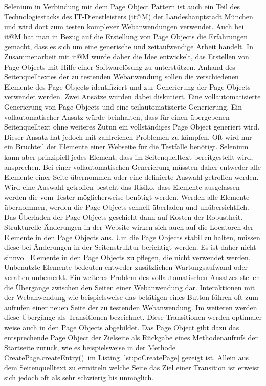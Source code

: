 Selenium in Verbindung mit dem Page Object Pattern ist auch ein Teil des Technologiestacks des IT-Dienstleisters (it@M) der Landeshauptstadt München und wird dort zum testen komplexer Webanwendungen verwendet. Auch bei it@M hat man in Bezug auf die Erstellung von Page Objects die Erfahrungen gemacht, dass es sich um eine generische und zeitaufwendige Arbeit handelt.
In Zusammenarbeit mit it@M wurde daher die Idee entwickelt, das Erstellen von Page Objects mit Hilfe einer Softwarelösung zu unterstützen. 
Anhand des Seitenquelltextes der zu testenden Webanwendung sollen die verschiedenen Elemente des Page Objects identifiziert und zur Generierung der Page Objects verwendet werden.
Zwei Ansätze wurden dabei diskutiert. Eine vollautomatisierte Generierung von Page Objects und eine teilautomatisierte Generierung.
Ein vollautomatischer Ansatz würde beinhalten, dass für einen übergebenen Seitenquelltext ohne weiteres Zutun ein vollständiges Page Object generiert wird. Dieser Ansatz hat jedoch mit zahlreichen Problemen zu kämpfen. Oft wird nur ein Bruchteil der Elemente einer Webseite für die Testfälle benötigt. Selenium kann aber prinzipiell jedes Element, dass im Seitenquelltext bereitgestellt wird, ansprechen. Bei einer vollautomatischen Generierung müssten daher entweder alle Elemente einer Seite übernommen oder eine definierte Auswahl getroffen werden.
Wird eine Auswahl getroffen besteht das Risiko, dass Elemente ausgelassen werden die vom Tester möglicherweise benötigt werden. Werden alle Elemente übernommen, werden die Page Objects schnell überladen und unübersichtlich. Das Überladen der Page Objects geschieht dann auf Kosten der Robustheit. Strukturelle Änderungen in der Website wirken sich auch auf die Locatoren der Elemente in den Page Objects aus. Um die Page Objects stabil zu halten, müssen diese bei Änderungen in der Seitenstruktur berichtigt werden.
Es ist daher nicht sinnvoll Elemente in den Page Objects zu pflegen, die nicht verwendet werden. Unbenutzte Elemente bedeuten entweder zusätzlichen Wartungsaufwand oder veralten unbemerkt.
Ein weiteres Problem des vollautomatischen Ansatzes stellen die Übergänge zwischen den Seiten einer Webanwendung dar. Interaktionen mit der Webanwendung wie beispielsweise das betätigen eines Button führen oft zum aufrufen einer neuen Seite der zu testenden Webanwendung. Im weiteren werden diese Übergänge als Transitionen bezeichnet. Diese Transitionen werden optimaler weise auch in den Page Objects abgebildet. Das Page Object gibt dazu das entsprechende Page Object der Zielseite als Rückgabe eines Methodenaufrufs der Startseite zurück, wie es beispielsweise in der Methode \grq CreatePage.createEntry()\grq\ im Listing \ref{lst:poCreatePage} gezeigt ist. Allein aus dem Seitenquelltext zu ermitteln welche Seite das Ziel einer Transition ist erweist sich jedoch oft als sehr schwierig bis unmöglich.
